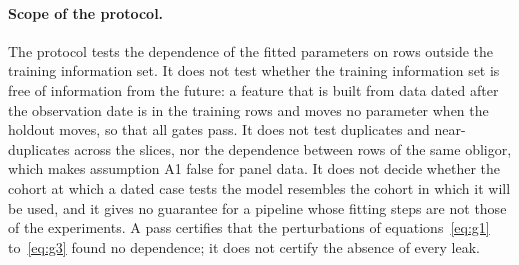 \paragraph{Scope of the protocol.} The protocol tests the dependence of the fitted parameters on rows outside the training information set. It does not test whether the training information set is free of information from the future: a feature that is built from data dated after the observation date is in the training rows and moves no parameter when the holdout moves, so that all gates pass. It does not test duplicates and near-duplicates across the slices, nor the dependence between rows of the same obligor, which makes assumption A1 false for panel data. It does not decide whether the cohort at which a dated case tests the model resembles the cohort in which it will be used, and it gives no guarantee for a pipeline whose fitting steps are not those of the experiments. A pass certifies that the perturbations of equations~\eqref{eq:g1} to~\eqref{eq:g3} found no dependence; it does not certify the absence of every leak.
